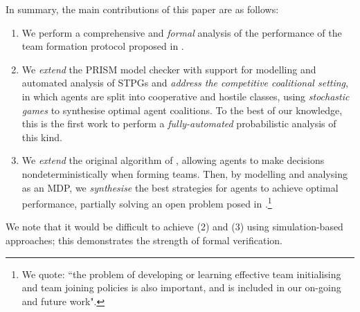 \documentclass{llncs}
\begin{document}
In summary, the main contributions of this paper are as follows:
\begin{enumerate}
  \renewcommand{\labelenumi}{(\arabic{enumi})}
  \item We perform a comprehensive and \emph{formal} analysis of the performance of the team formation protocol proposed in \cite{gaston2005agent}.

  \item  We \emph{extend} the  PRISM model checker with support for modelling and automated analysis of STPGs and \emph{address the competitive coalitional setting}, in which agents are split into cooperative and hostile classes, using \emph{stochastic games} to synthesise optimal agent coalitions. To the best of our knowledge, this is the first work to perform a \emph{fully-automated} probabilistic analysis of this kind.

  \item  We \emph{extend} the original algorithm of \cite{gaston2005agent}, allowing agents to make decisions nondeterministically when forming teams. Then, by modelling and analysing as an MDP, we \emph{synthesise} the best strategies for agents to achieve optimal performance, partially solving an open problem posed in \cite{gaston2005agent}.\footnote{We quote: ``the problem of developing or learning effective team initialising and team joining policies is also important, and is included in our on-going and future work".}

\end{enumerate}
%
We note that it would be difficult to achieve (2) and (3) using simulation-based approaches;
this demonstrates the strength of formal verification.
\end{document}
